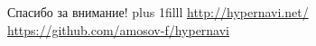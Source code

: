 \documentclass[11pt,slides,aspectratio=43]{beamer}%
\begin{document}
    \begin{frame}
        \begin{huge}
            \begin{center}
                \vskip50pt
                Спасибо за внимание!
                \vskip0pt plus 1filll
                \large\href{http://hypernavi.net/}{http://hypernavi.net/} \\
                \vskip5pt
                \large\href{https://github.com/amosov-f/hypernavi}{https://github.com/amosov-f/hypernavi}

            \end{center}
        \end{huge}
	\end{frame}
\end{document}

